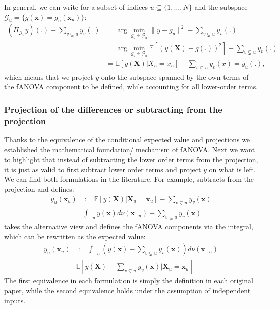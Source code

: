 In general, we can write for a subset of indices $u \subseteq \{1, \dots, N\}$ and the subspace $\mathcal{G}_u = \{g(\boldsymbol{x}) = g_u(\boldsymbol{x}_u)\}$:
\begin{align*}
    (\Pi_{\mathcal{G}_u}y)(.) - \sum_{v \subsetneq u} y_v(.)
    &= \arg \min_{g_u \in \mathcal{G}_u} \|y - g_u\|^2 - \sum_{v \subsetneq u} y_v(.)\\
    &= \arg \min_{g_u \in \mathcal{G}_{u}} \mathbb{E}[(y(\boldsymbol{X}) - g(.))^2] - \sum_{v \subsetneq u} y_v(.)\\
    &= \mathbb{E}[y(\boldsymbol{X}) | X_{u} = x_u] - \sum_{v \subsetneq u} y_v(x) = y_u(.),
\end{align*}
which means that we project $y$ onto the subspace spanned by the own terms of the fANOVA component to be defined, while accounting for all lower-order terms.

\subsubsection*{Projection of the differences or subtracting from the projection}
Thanks to the equivalence of the conditional expected value and projections we established the mathematical foundation/ mechanism of fANOVA.
Next we want to highlight that instead of subtracting the lower order terms from the projection, it is just as valid to first subtract lower order terms and project $y$ on what is left.
We can find both formulations in the literature.
For example, \cite{muehlenstaedt2012} subtracts from the projection and defines:
\begin{align*}
    y_u(\boldsymbol{x}_u) &:=
    \mathbb{E}[y(\boldsymbol{X}) | \boldsymbol{X}_{u} = \boldsymbol{x}_u] - \sum_{v \subsetneq u} y_v(\boldsymbol{x}) \\
    & \int_{-u} y(\boldsymbol{x}) d \nu(\boldsymbol{x}_{-u}) - \sum_{v \subsetneq u} y_v(\boldsymbol{x})
\end{align*}
\cite{hooker2004} takes the alternative view and defines the fANOVA components via the integral, which can be rewritten as the expected value:
\begin{align*}
    y_u(\boldsymbol{x}_u)
    &:= \int_{-u} (y(\boldsymbol{x}) - \sum_{v \subsetneq u} y_v(\boldsymbol{x})) d \nu(\boldsymbol{x}_{-u}) \\
    & \mathbb{E}[y(\boldsymbol{X}) - \sum_{v \subsetneq u} y_v(\boldsymbol{x}) | \boldsymbol{X}_{u} = \boldsymbol{x}_u ] 
\end{align*}
The first equivalence in each formulation is simply the definition in each original paper, while the second equivalence holds under the assumption of independent inputs.


